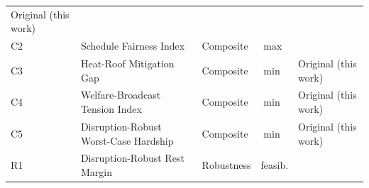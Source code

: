 \documentclass[12pt, letterpaper]{article}
\begin{document}
\begin{longtable}{@{}p{0.9cm} p{4.6cm} p{2.8cm} p{1.2cm} p{4.0cm}@{}}
      Original (this work) \\[2pt]
C2  & Schedule Fairness Index & Composite & $\max$ &
      \citet{Jain1984} \\[2pt]
C3  & Heat-Roof Mitigation Gap & Composite & $\min$ &
      Original (this work) \\[2pt]
C4  & Welfare-Broadcast Tension Index & Composite & $\min$ &
      Original (this work) \\[2pt]
C5  & Disruption-Robust Worst-Case Hardship & Composite & $\min$ &
      Original (this work) \\
\midrule
R1  & Disruption-Robust Rest Margin & Robustness & feasib. &
      \citet{Liebchen2009} \\
\end{longtable}



\end{document}
